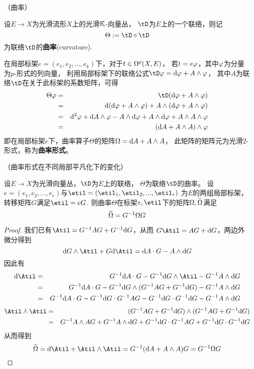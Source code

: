 \begin{definition}（曲率）

设$E\to X$为光滑流形$X$上的光滑$\mathbb{K}$-向量丛，
$\tD$为$E$上的一个联络，则记
$$\Theta:=\tD\circ\tD$$
为联络$\tD$的\textbf{曲率}(curvature).
\end{definition}

在局部标架$e=(e_1,e_2,...,e_k)$下，对于$t\in\Omega^p(X,E)$，
若$t=e\varphi$，其中$\varphi$为分量为$p$-形式的列向量，
利用局部标架下的联络公式$\tD\fai=\td\fai+A\wedge\fai$，
其中$A$为联络$\tD$在关于此标架的系数矩阵，可得
\begin{eqnarray*}
     \Theta\fai
&=&
     \tD(\td\fai+A\wedge\fai)\\
&=&
     \td(\td\fai+A\wedge\fai)
    +A\wedge(\td\fai+A\wedge\fai)\\
&=&
     \td^2\fai+\td A\wedge\fai
    -A\wedge\td\fai+A\wedge\td\fai+A\wedge A\wedge\fai\\
&=&
     (\td A+A\wedge A)\wedge\fai
\end{eqnarray*}
即在局部标架$e$下，曲率算子$\Theta$的矩阵$\Omega=\mathrm{d} A+A\wedge A$，
此矩阵的矩阵元为光滑$2$-形式，称为\textbf{曲率形式}。


\begin{prop}（曲率形式在不同局部平凡化下的变化）

设$E\to X$为光滑向量丛，$\tD$为$E$上的联络，
$\Theta$为联络$\tD$的曲率。
设$e=(e_1,e_2,...,e_r)$与$\etil=(\etil_1,\etil_2,...,\etil_r)$
为$E$的两组局部标架，转移矩阵$G$满足$\etil=eG$.
则曲率$\Theta$在标架$e,\etil$下的矩阵$\Omega,\widetilde{\Omega}$满足
$$
  \widetilde{\Omega}=G^{-1}\Omega G
$$
\end{prop}

\begin{proof}
我们已有$\Atil=G^{-1}AG+G^{-1}\td G$，从而
$G\Atil=AG+\td G$，两边外微分得到
$$
  \td G\wedge\Atil+G\td\Atil
= \td A\cdot G-A\wedge\td G
$$
因此有
\begin{eqnarray*}
     \td\Atil
&=&
     G^{-1}\td A\cdot G
    -G^{-1}\td G\wedge\Atil
    -G^{-1}A\wedge\td G\\
&=&
     G^{-1}\td A\cdot G
    -G^{-1}\td G\wedge(G^{-1}AG+G^{-1}\td G)
    -G^{-1}A\wedge\td G\\
&=&
     G^{-1}\td A\cdot G
    -G^{-1}\td G\cdot G^{-1}AG
    -G^{-1}\td G\cdot G^{-1}\td G
    -G^{-1}A\wedge\td G
\end{eqnarray*}
\begin{eqnarray*}
     \Atil\wedge\Atil
&=&
     (G^{-1}AG+G^{-1}\td G)
     \wedge
     (G^{-1}AG+G^{-1}\td G)\\
&=&
     G^{-1}A\wedge AG
    +G^{-1}A\wedge\td G
    +G^{-1}\td G\cdot G^{-1}AG
    +G^{-1}\td G\cdot G^{-1}\td G
\end{eqnarray*}
从而得到
$$
  \Omgtil=\td\Atil+\Atil\wedge\Atil
= G^{-1}(\td A+A\wedge A)G=G^{-1}\Omg G
$$
\end{proof}

